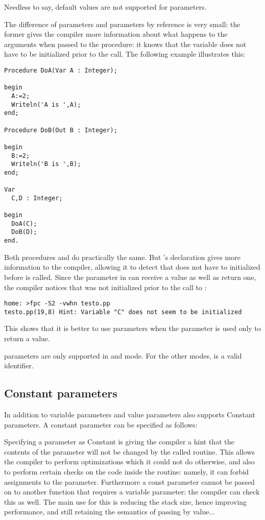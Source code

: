 Needless to say, default values are not supported for  parameters.

The difference of  parameters and parameters by reference is very small:
the former gives the compiler more information about what happens to the
arguments when passed to the procedure: it knows that the variable does not
have to be initialized prior to the call. The following example illustrates
this:
\begin{verbatim}
Procedure DoA(Var A : Integer);

begin
  A:=2;
  Writeln('A is ',A);
end;

Procedure DoB(Out B : Integer);

begin
  B:=2;
  Writeln('B is ',B);
end;

Var
  C,D : Integer;

begin
  DoA(C);
  DoB(D);
end.
\end{verbatim}
Both procedures  and  do practically the same. But
's declaration gives more information to the compiler, allowing
it to detect that  does not have to initialized before 
is called. Since the parameter  in  can receive a value as
well as return one, the compiler notices that  was not initialized
prior to the call to :
\begin{verbatim}
home: >fpc -S2 -vwhn testo.pp
testo.pp(19,8) Hint: Variable "C" does not seem to be initialized
\end{verbatim}
This shows that it is better to use  parameters when the parameter
is used only to return a value.

\begin{remark}
 parameters are only supported in  and  mode. For the other 
modes,  is a valid identifier.
\end{remark}

%
\subsection{Constant parameters}
In addition to variable parameters and value parameters \fpc also supports
Constant parameters. A constant parameter can be specified as follows:

Specifying a parameter as Constant is giving the compiler a hint that the
contents of the parameter will not be changed by the called routine. This
allows the compiler to perform optimizations which it could not do otherwise, 
and also to perform certain checks on the code inside the routine: namely,
it can forbid assignments to the parameter. 
Furthermore a const parameter cannot be passed on to another
function that requires a variable parameter: the compiler can check this as
well.
The main use for this is reducing the stack size, hence improving
performance, and still retaining the semantics of passing by value...


